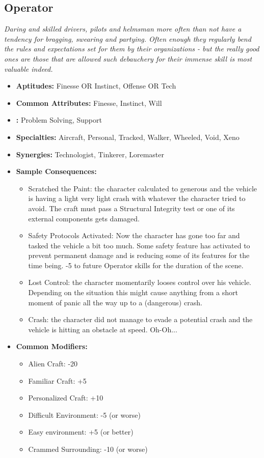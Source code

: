  \subsection{Operator}\label{Operator}
 \textit{Daring and skilled drivers, pilots and helmsman more often than not have a tendency for bragging, swearing and partying.
 Often enough they regularly bend the rules and expectations set for them by their organizations - but the really good ones are those that are allowed such debauchery for their immense skill is most valuable indeed.}
 \begin{itemize}
 	\item \textbf{Aptitudes:} Finesse OR Instinct, Offense OR Tech
 	\item \textbf{Common Attributes:} Finesse, Instinct, Will
 	\item \textbf{:} Problem Solving, Support
 	\item \textbf{Specialties:} Aircraft, Personal, Tracked, Walker, Wheeled, Void, Xeno
 	\item \textbf{Synergies:} Technologist, Tinkerer, Loremaster
 	\item \textbf{Sample Consequences:} 
 	\begin{itemize}
 		\item Scratched the Paint: the character calculated to generous and the vehicle is having a light very light crash with whatever the character tried to avoid. The craft must pass a Structural Integrity test or one of its external components gets damaged.
 		\item Safety Protocols Activated: Now the character has gone too far and tasked the vehicle a bit too much. Some safety feature has activated to prevent permanent damage and is reducing some of its features for the time being. -5 to future Operator skills for the duration of the scene.
 		\item Lost Control: the character momentarily looses control over his vehicle. Depending on the situation this might cause anything from a short moment of panic all the way up to a (dangerous) crash.
 		\item Crash: the character did not manage to evade a potential crash and the vehicle is hitting an obstacle at speed. Oh-Oh...
 	\end{itemize}
 	\item \textbf{Common Modifiers:}
 	\begin{itemize}
 		\item Alien Craft: -20
 		\item Familiar Craft: +5
 		\item Personalized Craft: +10
 		\item Difficult Environment: -5 (or worse)
 		\item Easy environment: +5 (or better)
 		\item Crammed Surrounding: -10 (or worse)
 	\end{itemize}
 \end{itemize}

